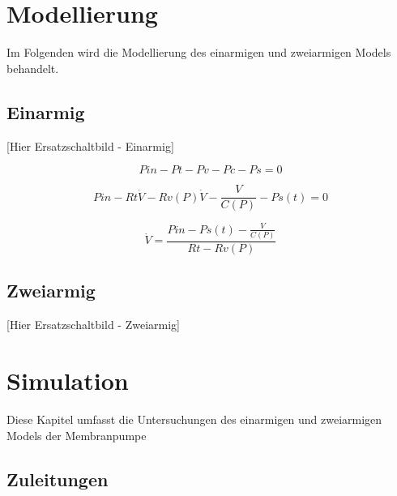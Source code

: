 \documentclass[fontsize=12pt, a4paper]{scrartcl}
\let\stdsection\section 	%
\renewcommand\section{\newpage\stdsection}
\begin{document}
\section{Modellierung}

Im Folgenden wird die Modellierung des einarmigen und zweiarmigen Models behandelt.

\subsection{Einarmig}

[Hier Ersatzschaltbild - Einarmig]

\begin{center}
	
\end{center}


\[ Pin - Pt - Pv - Pc - Ps = 0 \]

\[ Pin - Rt\dot{V} - Rv(P)\dot{V} - \frac{V}{C(P)} - Ps(t) = 0 \]

\[ \dot{V} = \frac{Pin - Ps(t) - \frac{V}{C(P)}}{Rt - Rv(P)} \]


\subsection{Zweiarmig}

[Hier Ersatzschaltbild - Zweiarmig]

\begin{center}
	
\end{center}

\section{Simulation}

Diese Kapitel umfasst die Untersuchungen des einarmigen und zweiarmigen Models der Membranpumpe

\subsection{Zuleitungen}
\end{document}
